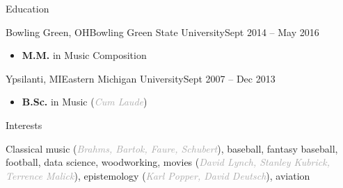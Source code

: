 \documentclass[calibri]{mcdowellcv}
\begin{document}
	\begin{cvsection}{Education}
		\begin{cvsubsection}{Bowling Green, OH}{Bowling Green State University}{Sept 2014 -- May 2016}
			\begin{itemize}
				\item \textbf{M.M.} in Music Composition
			\end{itemize}
		\end{cvsubsection}
		\begin{cvsubsection}{Ypsilanti, MI}{Eastern Michigan University}{Sept 2007 -- Dec 2013}
			\begin{itemize}
				\item \textbf{B.Sc.} in Music (\textit{\textcolor{darkgray}{Cum Laude}})
			\end{itemize}
		\end{cvsubsection}
	\end{cvsection}

	\begin{cvsection}{Interests}
		\begin{cvsubsection}{}{}{}
			Classical music (\textit{\textcolor{darkgray}{Brahms, Bartok, Faure, Schubert}}), baseball, fantasy baseball, football, data science, woodworking, movies (\textit{\textcolor{darkgray}{David Lynch, Stanley Kubrick, Terrence Malick}}), epistemology (\textit{\textcolor{darkgray}{Karl Popper, David Deutsch}}), aviation
		\end{cvsubsection}
	\end{cvsection}
\end{document}
